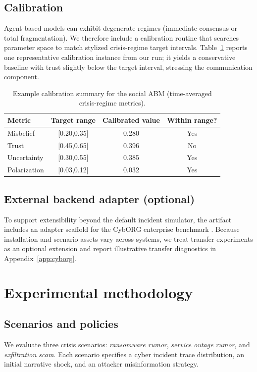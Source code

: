 \documentclass[referee,lineno,sn-basic]{sn-jnl}
\begin{document}
\subsection{Calibration}
Agent-based models can exhibit degenerate regimes (immediate consensus or total fragmentation). We therefore include a calibration routine that searches parameter space to match stylized crisis-regime target intervals. Table~\ref{tab:calibration} reports one representative calibration instance from our run; it yields a conservative baseline with trust slightly below the target interval, stressing the communication component.

\begin{table}[t]
\centering
\caption{Example calibration summary for the social ABM (time-averaged crisis-regime metrics).}
\label{tab:calibration}
\small
\begin{tabular}{lccc}
\toprule
Metric & Target range & Calibrated value & Within range? \\
\midrule
Misbelief & [0.20,0.35] & 0.280 & Yes \\
Trust & [0.45,0.65] & 0.396 & No \\
Uncertainty & [0.30,0.55] & 0.385 & Yes \\
Polarization & [0.03,0.12] & 0.032 & Yes \\
\bottomrule
\end{tabular}
\end{table}

\subsection{External backend adapter (optional)}
To support extensibility beyond the default incident simulator, the artifact includes an adapter scaffold for the CybORG enterprise benchmark \citep{baillie2020cyborg,standen2021cyborg,emerson2024cyborgpp}. Because installation and scenario assets vary across systems, we treat transfer experiments as an optional extension and report illustrative transfer diagnostics in Appendix~\ref{app:cyborg}.

\section{Experimental methodology}
\subsection{Scenarios and policies}
We evaluate three crisis scenarios: \emph{ransomware rumor}, \emph{service outage rumor}, and \emph{exfiltration scam}. Each scenario specifies a cyber incident trace distribution, an initial narrative shock, and an attacker misinformation strategy.
\end{document}
